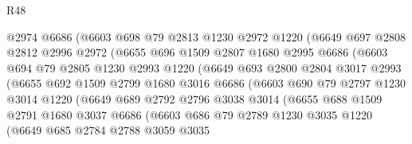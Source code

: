 \begin{lexlean}{R48}
\begin{coremodule}
                  @2974
                  @6686
                  (@6603
                    @698
                    @79
                    @2813
                    @1230
                    @2972
                    @1220
                    (@6649
                      @697
                      @2808
                      @2812
                      @2996
                      @2972
                      (@6655
                        @696
                        @1509
                        @2807
                        @1680
                        @2995
                        @6686
                        (@6603
                          @694
                          @79
                          @2805
                          @1230
                          @2993
                          @1220
                          (@6649
                            @693
                            @2800
                            @2804
                            @3017
                            @2993
                            (@6655
                              @692
                              @1509
                              @2799
                              @1680
                              @3016
                              @6686
                              (@6603
                                @690
                                @79
                                @2797
                                @1230
                                @3014
                                @1220
                                (@6649
                                  @689
                                  @2792
                                  @2796
                                  @3038
                                  @3014
                                  (@6655
                                    @688
                                    @1509
                                    @2791
                                    @1680
                                    @3037
                                    @6686
                                    (@6603
                                      @686
                                      @79
                                      @2789
                                      @1230
                                      @3035
                                      @1220
                                      (@6649
                                        @685
                                        @2784
                                        @2788
                                        @3059
                                        @3035

\end{coremodule}
\end{lexlean}
